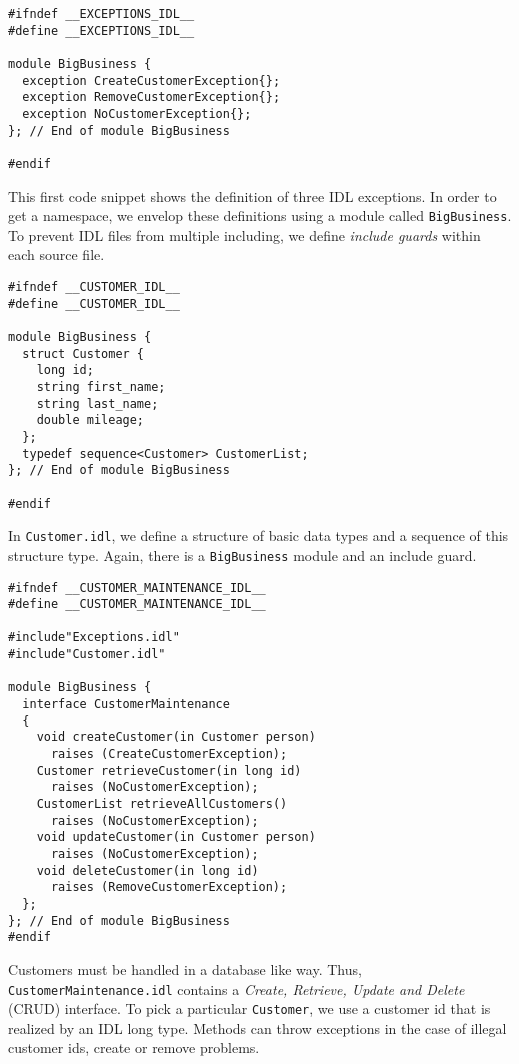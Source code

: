 \begin{small}
\begin{verbatim}
#ifndef __EXCEPTIONS_IDL__
#define __EXCEPTIONS_IDL__

module BigBusiness {
  exception CreateCustomerException{};
  exception RemoveCustomerException{};
  exception NoCustomerException{};
}; // End of module BigBusiness

#endif
\end{verbatim}
\end{small}
This first code snippet shows the definition of three IDL exceptions.
In order to get a namespace, we envelop these definitions using a module called 
{\tt BigBusiness}. 
To prevent IDL files from multiple including, we define {\it include guards} 
within each source file.



 
\begin{small}
\begin{verbatim}
#ifndef __CUSTOMER_IDL__
#define __CUSTOMER_IDL__

module BigBusiness {
  struct Customer {
    long id;
    string first_name;
    string last_name;
    double mileage;
  };
  typedef sequence<Customer> CustomerList;
}; // End of module BigBusiness

#endif
\end{verbatim}
\end{small}

In {\tt Customer.idl}, we define a structure of basic data types and a sequence 
of this structure type.
Again, there is a {\tt BigBusiness} module and an include guard.

\begin{small}
\begin{verbatim}
#ifndef __CUSTOMER_MAINTENANCE_IDL__
#define __CUSTOMER_MAINTENANCE_IDL__

#include"Exceptions.idl"
#include"Customer.idl"

module BigBusiness {
  interface CustomerMaintenance
  {
    void createCustomer(in Customer person) 
      raises (CreateCustomerException);
    Customer retrieveCustomer(in long id)  
      raises (NoCustomerException);
    CustomerList retrieveAllCustomers()  
      raises (NoCustomerException);
    void updateCustomer(in Customer person)  
      raises (NoCustomerException);
    void deleteCustomer(in long id)  
      raises (RemoveCustomerException);
  };
}; // End of module BigBusiness
#endif
\end{verbatim}
\end{small}
Customers must be handled in a database like way. 
Thus, {\tt CustomerMaintenance.idl} contains a 
{\it Create, Retrieve, Update and Delete} (CRUD) interface. 
To pick a particular {\tt Customer}, we use a customer id that is realized by 
an IDL long type.
Methods can throw exceptions in the case of illegal customer ids, create or 
remove problems. 


